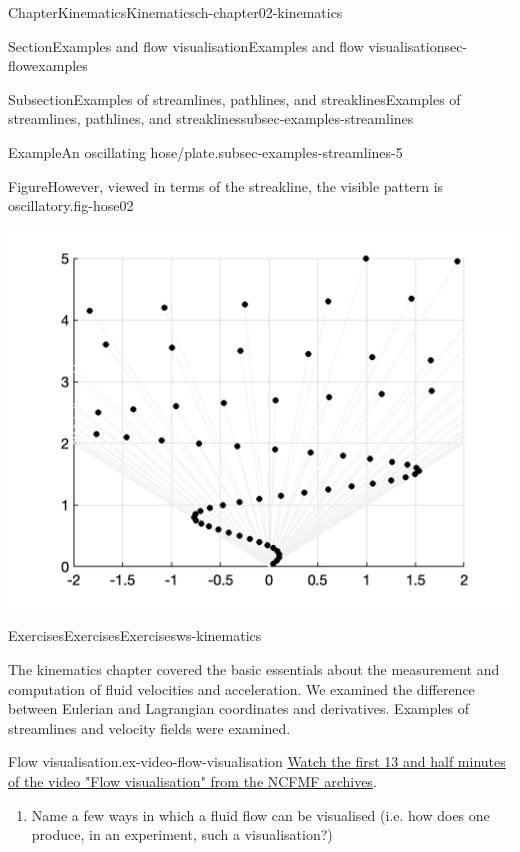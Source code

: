 \documentclass[oneside,10pt,]{book}
\numberwithin{equation}{section}
\begin{document}
\begin{chapterptx}{Chapter}{Kinematics}{}{Kinematics}{}{}{ch-chapter02-kinematics}
\begin{sectionptx}{Section}{Examples and flow visualisation}{}{Examples and flow visualisation}{}{}{sec-flowexamples}
\begin{subsectionptx}{Subsection}{Examples of streamlines, pathlines, and streaklines}{}{Examples of streamlines, pathlines, and streaklines}{}{}{subsec-examples-streamlines}
\begin{example}{Example}{An oscillating hose\slash{}plate.}{subsec-examples-streamlines-5}
\begin{figureptx}{Figure}{However, viewed in terms of the streakline, the visible pattern is oscillatory.}{fig-hose02}{}
\begin{image}{0.1}{0.8}{0.1}{}
\includegraphics[width=\linewidth]{external/hose02.png}
\end{image}%
\tcblower
\end{figureptx}%
\end{example}
\end{subsectionptx}
\end{sectionptx}
%
%
\typeout{************************************************}
\typeout{************************************************}
%
\begin{exercises-section}{Exercises}{Exercises}{}{Exercises}{}{}{ws-kinematics}
\begin{introduction}{}%
The kinematics chapter covered the basic essentials about the measurement and computation of fluid velocities and acceleration. We examined the difference between Eulerian and Lagrangian coordinates and derivatives. Examples of streamlines and velocity fields were examined.%
\end{introduction}%
\begin{divisionexercise}{1}{Flow visualisation.}{}{ex-video-flow-visualisation}%
\href{https://techtv.mit.edu/collections/ifluids/videos/32598-flow-visualization}{Watch the first 13 and half minutes of the video "Flow visualisation" from the NCFMF archives}.%
\begin{enumerate}[font=\bfseries,label=(\alph*),ref=\alph*]%
\item{}Name a few ways in which a fluid flow can be visualised (i.e. how does one produce, in an experiment, such a visualisation?)%

\end{enumerate}
\end{divisionexercise}
\end{exercises-section}
\end{chapterptx}
\end{document}
